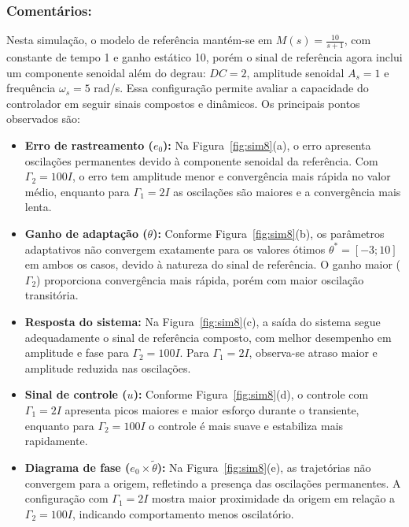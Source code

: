 \documentclass[10pt]{article}
\begin{document}
\subsubsection{Comentários:}

Nesta simulação, o modelo de referência mantém-se em $M(s) = \frac{10}{s+1}$, com constante de tempo 1 e ganho estático 10, porém o sinal de referência agora inclui um componente senoidal além do degrau: $DC = 2$, amplitude senoidal $A_s = 1$ e frequência $\omega_s = 5$ rad/s. Essa configuração permite avaliar a capacidade do controlador em seguir sinais compostos e dinâmicos. Os principais pontos observados são:

\begin{itemize}
    \item \textbf{Erro de rastreamento ($e_0$):} Na Figura~\ref{fig:sim8}(a), o erro apresenta oscilações permanentes devido à componente senoidal da referência. Com $\Gamma_2 = 100I$, o erro tem amplitude menor e convergência mais rápida no valor médio, enquanto para $\Gamma_1 = 2I$ as oscilações são maiores e a convergência mais lenta.

    \item \textbf{Ganho de adaptação ($\theta$):} Conforme Figura~\ref{fig:sim8}(b), os parâmetros adaptativos não convergem exatamente para os valores ótimos $\theta^* = [-3; 10]$ em ambos os casos, devido à natureza do sinal de referência. O ganho maior ($\Gamma_2$) proporciona convergência mais rápida, porém com maior oscilação transitória.

    \item \textbf{Resposta do sistema:} Na Figura~\ref{fig:sim8}(c), a saída do sistema segue adequadamente o sinal de referência composto, com melhor desempenho em amplitude e fase para $\Gamma_2 = 100I$. Para $\Gamma_1 = 2I$, observa-se atraso maior e amplitude reduzida nas oscilações.

    \item \textbf{Sinal de controle ($u$):} Conforme Figura~\ref{fig:sim8}(d), o controle com $\Gamma_1 = 2I$ apresenta picos maiores e maior esforço durante o transiente, enquanto para $\Gamma_2 = 100I$ o controle é mais suave e estabiliza mais rapidamente.

    \item \textbf{Diagrama de fase ($e_0 \times \tilde{\theta}$):} Na Figura~\ref{fig:sim8}(e), as trajetórias não convergem para a origem, refletindo a presença das oscilações permanentes. A configuração com $\Gamma_1 = 2I$ mostra maior proximidade da origem em relação a $\Gamma_2 = 100I$, indicando comportamento menos oscilatório.

\end{itemize}
\end{document}
